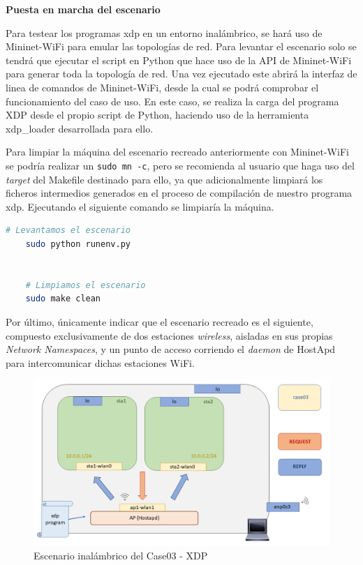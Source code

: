 \vspace{0.5cm}
\textbf{Puesta en marcha del escenario}\\
\par

Para testear los programas \gls{xdp} en un entorno inalámbrico, se hará uso de Mininet-WiFi para emular las topologías de red. Para levantar el escenario solo se tendrá que ejecutar el script en Python que hace uso de la API de Mininet-WiFi para generar toda la topología de red. Una vez ejecutado este abrirá la interfaz de linea de comandos de Mininet-WiFi, desde la cual se podrá comprobar el funcionamiento del caso de uso. En este caso, se realiza la carga del programa XDP desde el propio script de Python, haciendo uso de la herramienta xdp\_loader desarrollada para ello. \\
\par

Para limpiar la máquina del escenario recreado anteriormente con Mininet-WiFi se podría realizar un \texttt{sudo mn -c}, pero se recomienda al usuario que haga uso del \textit{target} del Makefile destinado para ello, ya que adicionalmente limpiará los ficheros intermedios generados en el proceso de compilación de nuestro programa \gls{xdp}. Ejecutando el siguiente comando se limpiaría la máquina.
\newpage
\begin{lstlisting}[language= bash, style=Consola, caption={Compilación programa XDP - Case03},label=code:case03_xdp_wifi_run]
    # Levantamos el escenario
    sudo python runenv.py
    
    
    # Limpiamos el escenario
    sudo make clean
\end{lstlisting}
\vspace{0.7cm}


Por último, únicamente indicar que el escenario recreado es el siguiente, compuesto exclusivamente de dos estaciones \textit{wireless}, aisladas en sus propias \textit{Network Namespaces}, y un punto de acceso corriendo el \textit{daemon} de HostApd para intercomunicar dichas estaciones WiFi.\\
\par

\begin{figure}[ht]
    \centering
    \includegraphics[width=16cm]{archivos/img/dev/xdp-wifi/case03/scenario.png}
    \caption{Escenario inalámbrico del Case03 - XDP}
    \label{fig:case03_xdp_wifi_scenario}
\end{figure}


